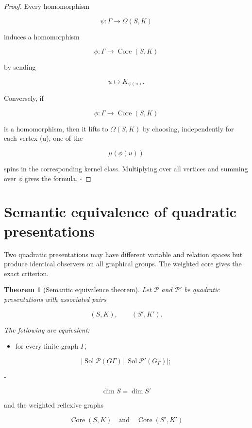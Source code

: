 \documentclass[11pt]{article}
\newtheorem{theorem}{Theorem}[section]
\begin{document}
\begin{proof}
Every homomorphism

\[
\psi:\Gamma\to\Omega(S,K)
\]

induces a homomorphism

\[
\phi:\Gamma\to\operatorname{Core}(S,K)
\]

by sending

\[
u\mapsto K_{\psi(u)}.
\]

Conversely, if

\[
\phi:\Gamma\to\operatorname{Core}(S,K)
\]

is a homomorphism, then it lifts to $\Omega(S,K)$ by choosing, independently for each vertex (u), one of the

\[
\mu(\phi(u))
\]

spins in the corresponding kernel class. Multiplying over all vertices and summing over $\phi$ gives the formula. $\square$

\end{proof}

\section{Semantic equivalence of quadratic presentations}

Two quadratic presentations may have different variable and relation spaces but produce identical observers on all graphical groups. The weighted core gives the exact criterion.

\begin{theorem}[Semantic equivalence theorem]
Let $\mathcal P$ and $\mathcal P'$ be quadratic presentations with associated pairs

\[
(S,K),
\qquad
(S',K').
\]

The following are equivalent:

\end{theorem}

\begin{itemize}
\item for every finite graph $\Gamma$,
\end{itemize}

\[
|\operatorname{Sol}
{\mathcal P}(G
\Gamma)|
|\operatorname{Sol}{\mathcal P'}(G_\Gamma)|;
\]

-

\[
\dim S=\dim S'
\]

and the weighted reflexive graphs

\[
\operatorname{Core}(S,K)
\quad\text{and}\quad
\operatorname{Core}(S',K')
\]
\end{document}
